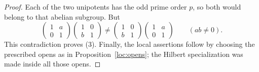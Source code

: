 \begin{proof}
Each of the two unipotents has the odd prime order $p$, so both
would belong to that abelian subgroup.  But
\[
 \begin{pmatrix}1&a\\0&1\end{pmatrix}
 \begin{pmatrix}1&0\\b&1\end{pmatrix}
 \ne
 \begin{pmatrix}1&0\\b&1\end{pmatrix}
 \begin{pmatrix}1&a\\0&1\end{pmatrix}
 \qquad(a b\ne0).
\]
This contradiction proves (3).  Finally, the local assertions
follow by choosing the prescribed opens as in
Proposition~\ref{loc:opens}; the Hilbert specialization was made
inside all those opens.
\end{proof}
